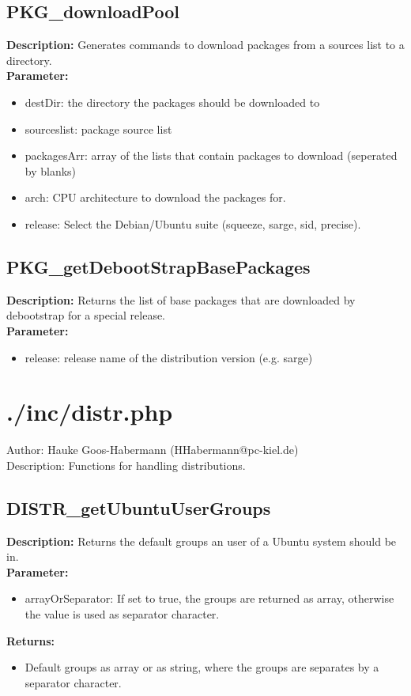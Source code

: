 \subsection{PKG\_downloadPool}
\textbf{Description:} Generates commands to download packages from a sources list to a directory.\\
\textbf{Parameter:}
\begin{itemize}
\item destDir: the directory the packages should be downloaded to
\item sourceslist: package source list
\item packagesArr: array of the lists that contain packages to download (seperated by blanks)
\item arch: CPU architecture to download the packages for.
\item release: Select the Debian/Ubuntu suite (squeeze, sarge, sid, precise).
\end{itemize}

\subsection{PKG\_getDebootStrapBasePackages}
\textbf{Description:} Returns the list of base packages that are downloaded by debootstrap for a special release.\\
\textbf{Parameter:}
\begin{itemize}
\item release: release name of the distribution version (e.g. sarge)
\end{itemize}

\newpage\section{./inc/distr.php}
 Author: Hauke Goos-Habermann (HHabermann@pc-kiel.de)\\
 Description: Functions for handling distributions.\\

\subsection{DISTR\_getUbuntuUserGroups}
\textbf{Description:} Returns the default groups an user of a Ubuntu system should be in.\\
\textbf{Parameter:}
\begin{itemize}
\item arrayOrSeparator: If set to true, the groups are returned as array, otherwise the value is used as separator character.
\end{itemize}
\textbf{Returns:}
\begin{itemize}
\item Default groups as array or as string, where the groups are separates by a separator character.
\end{itemize}

